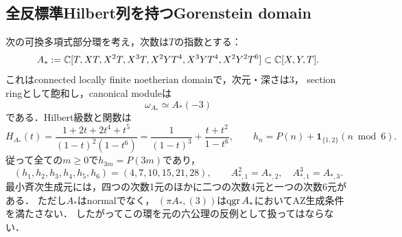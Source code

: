 \documentclass[11pt,a4paper]{ltjsarticle}
\begin{document}
\subsection{全反標準Hilbert列を持つGorenstein domain}
\begin{proposition}[全Hilbert列でも残る非normalな実乗法]\label{prop:fullhilbertring}
次の可換多項式部分環を考え，次数は$T$の指数とする：
\[
 A_*:=\mathbb C[T,XT,X^2T,X^3T,X^2YT^4,X^3YT^4,X^2Y^2T^6]
       \subset\mathbb C[X,Y,T].
\]
これはconnected locally finite noetherian domainで，次元・深さは3，
section ringとして飽和し，canonical moduleは
\[
 \omega_{A_*}\simeq A_*(-3)
\]
である．Hilbert級数と関数は
\[
 H_{A_*}(t)=\frac{1+2t+2t^4+t^5}{(1-t)^2(1-t^6)}
 =\frac1{(1-t)^3}+\frac{t+t^2}{1-t^6},
 \qquad
 h_n=P(n)+\mathbf1_{\{1,2\}}(n\bmod6).
\]
従って全ての$m\geq0$で$h_{3m}=P(3m)$であり，
\[
 (h_1,h_2,h_3,h_4,h_5,h_6)=(4,7,10,15,21,28),\qquad
 A_{*,1}^2=A_{*,2},\quad A_{*,1}^3=A_{*,3}.
\]
最小斉次生成元には，四つの次数1元のほかに二つの次数4元と一つの次数6元がある．
ただし$A_*$はnormalでなく，
$(\pi A_*,(3))$は$\operatorname{qgr} A_*$においてAZ生成条件を満たさない．
したがってこの環を元の六公理の反例として扱ってはならない．
\end{proposition}
\end{document}
